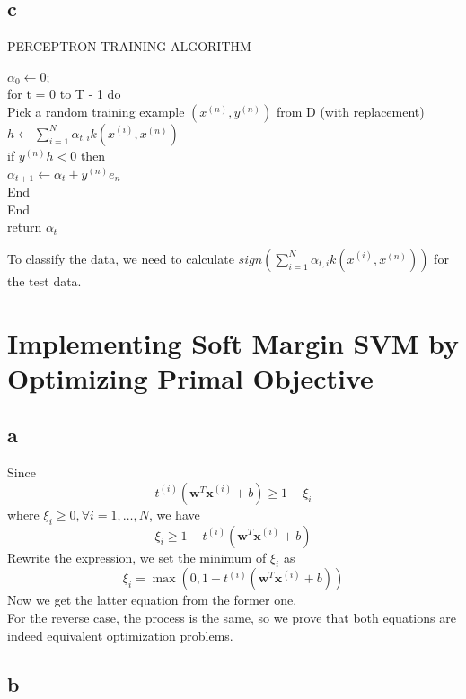\documentclass{article}
\begin{document}
\subsection*{c}

\begin{algorithm}[H]
    \caption{PERCEPTRON TRAINING ALGORITHM}
    $\alpha_0 \gets 0$; \\
    for t = 0 to T - 1 do \\
    \quad Pick a random training example $(x^{(n)}, y^{(n)})$ from D (with replacement) \\
    \quad $h \gets \sum_{i=1}^{N} \alpha_{t,i}k(x^{(i)}, x^{(n)})$ \\
    \quad if $y^{(n)}h < 0$ then \\
    \quad \quad $\alpha_{t+1} \gets \alpha_t + y^{(n)}e_n$ \\
    \quad End \\
    End \\
return $\alpha_t$
\end{algorithm}
To classify the data, we need to calculate $sign(\sum_{i=1}^{N} \alpha_{t,i}k(x^{(i)}, x^{(n)}))$ for the test data.

\section{Implementing Soft Margin SVM by Optimizing Primal Objective}

\subsection*{a}

Since
$$t^{(i)}(\boldsymbol{w}^{T} \boldsymbol{x}^{(i)}+b) \geq 1-\xi_{i}$$
where $\xi_{i} \geq 0, \forall i=1, \ldots, N$, we have
$$\xi_i \geq 1- t^{(i)}(\boldsymbol{w}^{T} \boldsymbol{x}^{(i)}+b)$$
Rewrite the expression, we set the minimum of $\xi_i$ as
$$\xi_i = \max(0, 1-t^{(i)}(\boldsymbol{w}^{T} \boldsymbol{x}^{(i)}+b))$$
Now we get the latter equation from the former one. \\
For the reverse case, the process is the same, so we prove that both equations are indeed equivalent optimization problems.

\subsection*{b}
\end{document}
